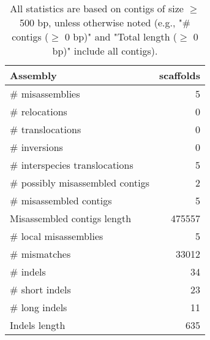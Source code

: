 \documentclass[12pt,a4paper]{article}
\begin{document}
\begin{table}[ht]
\begin{center}
\caption{All statistics are based on contigs of size $\geq$ 500 bp, unless otherwise noted (e.g., "\# contigs ($\geq$ 0 bp)" and "Total length ($\geq$ 0 bp)" include all contigs).}
\begin{tabular}{|l*{1}{|r}|}
\hline
Assembly & scaffolds \\ \hline
\# misassemblies & 5 \\ \hline
\hspace{5mm}\# relocations & 0 \\ \hline
\hspace{5mm}\# translocations & 0 \\ \hline
\hspace{5mm}\# inversions & 0 \\ \hline
\hspace{5mm}\# interspecies translocations & 5 \\ \hline
\# possibly misassembled contigs & 2 \\ \hline
\# misassembled contigs & 5 \\ \hline
Misassembled contigs length & 475557 \\ \hline
\# local misassemblies & 5 \\ \hline
\# mismatches & 33012 \\ \hline
\# indels & 34 \\ \hline
\hspace{5mm}\# short indels & 23 \\ \hline
\hspace{5mm}\# long indels & 11 \\ \hline
Indels length & 635 \\ \hline
\end{tabular}
\end{center}
\end{table}
\end{document}

